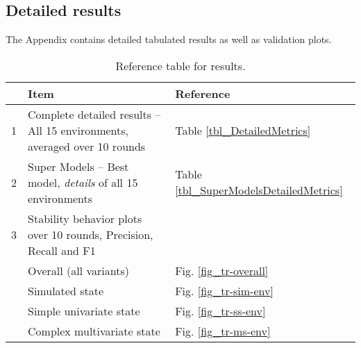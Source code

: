 \documentclass[referee, sn-mathphys-num]{sn-jnl}
\newcommand{\rowspace}[1]{\renewcommand{\arraystretch}{#1}}
\newcommand{\ltmidrule} {\arrayrulecolor{black!20} \midrule}
\begin{document}
	\bigskip
	\bigskip
	\begin{appendices}
		\setcounter{table}{0}
		\renewcommand\theHtable{Appendix.\thetable}
		\setcounter{figure}{0}
		\renewcommand\theHfigure{Appendix.\thefigure}
		
		\section{Detailed results}\label{apx}
		The Appendix contains detailed tabulated results as well as validation plots.
		\begin{table}[!h]
			\rowspace{1.6}
			\caption{Reference table for results.}\label{tbl_apx_results}
			{\begin{tabular}{R{0.25cm} L{11.5cm} L{3cm}}
					\toprule 			
					& Item & Reference\\ \midrule
					
					1 & Complete detailed results -- All 15 environments, averaged over 10 rounds & Table \ref{tbl_DetailedMetrics}\\\ltmidrule
					
					2 & Super Models -- Best model, \textit{details} of all 15 environments & Table \ref{tbl_SuperModelsDetailedMetrics}\\\ltmidrule
					
					3 & Stability behavior plots over 10 rounds, Precision, Recall and F1\\
					& \quad\quad Overall (all variants)  & Fig. \ref{fig_tr-overall}\\
					& \quad\quad Simulated state & Fig. \ref{fig_tr-sim-env}\\
					& \quad\quad Simple univariate state & Fig. \ref{fig_tr-ss-env}\\
					& \quad\quad Complex multivariate state & Fig. \ref{fig_tr-ms-env}\\
					\bottomrule
			\end{tabular}}
		\end{table}
		

\end{appendices}
\end{document}
